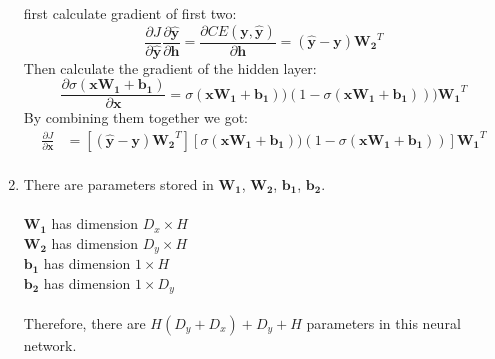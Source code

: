 \documentclass[10pt]{article}
\begin{document}
\begin{enumerate}[label=(\alph*)]
first calculate gradient of first two:
\begin{equation*}
	\frac{\partial J}{\partial \mathbf{\hat{y}}}\frac{\partial \mathbf{\hat{y}}}{\partial \mathbf{h}} = \frac{\partial CE(\mathbf{y}, \mathbf{\hat{y}})}{\partial \mathbf{h}} = (\mathbf{\hat{y}} - \mathbf{y})\mathbf{W_2}^T
\end{equation*}
Then calculate the gradient of the hidden layer:
\begin{equation*}
	\frac{\partial \sigma(\mathbf{xW_1}+\mathbf{b_1})}{\partial \mathbf{x}} = \sigma(\mathbf{xW_1}+\mathbf{b_1}))(1-\sigma(\mathbf{xW_1}+\mathbf{b_1})))\mathbf{W_1}^T
\end{equation*}
By combining them together we got:
\begin{equation*}
\begin{aligned}
	\frac{\partial J}{\partial \mathbf{x}} & = [(\mathbf{\hat{y}} - \mathbf{y})\mathbf{W_2}^T][\sigma(\mathbf{xW_1}+\mathbf{b_1}))(1-\sigma(\mathbf{xW_1}+\mathbf{b_1}))]\mathbf{W_1}^T\\
\end{aligned}
\end{equation*}

\item
There are parameters stored in $\mathbf{W_1}$, $\mathbf{W_2}$, $\mathbf{b_1}$, $\mathbf{b_2}$.\\
\\
$\mathbf{W_1}$ has dimension $D_x \times H$\\
$\mathbf{W_2}$ has dimension $D_y \times H$\\
$\mathbf{b_1}$ has dimension $1 \times H$\\
$\mathbf{b_2}$ has dimension $1 \times D_y$\\
\\
Therefore, there are $H(D_y+D_x)+D_y+H$ parameters in this neural network.
\end{enumerate}

\pagebreak[4]
\end{document}
